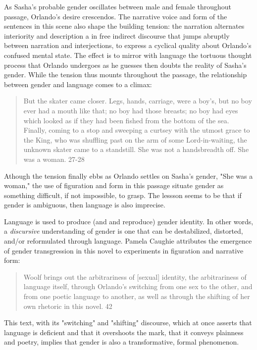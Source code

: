 \documentclass[11pt]{article}
\begin{document}
As Sasha’s probable gender oscillates between male and female
throughout passage, Orlando’s desire crescendos. The narrative voice
and form of the sentences in this scene also shape the building
tension: the narration alternates interiority and description a in
free indirect discourse that jumps abruptly between narration and
interjections, to express a cyclical quality about Orlando’s confused
mental state. The effect is to mirror with language the tortuous
thought process that Orlando undergoes as he guesses then doubts the
reality of Sasha’s gender. While the tension thus mounts throughout
the passage, the relationship between gender and language comes to a
climax:
\begin{quote}
But the skater came closer. Legs, hands, carriage, were a boy’s, but
no boy ever had a mouth like that; no boy had those breasts; no boy
had eyes which looked as if they had been fished from the bottom of
the sea. Finally, coming to a stop and sweeping a curtsey with the
utmost grace to the King, who was shuffling past on the arm of some
Lord-in-waiting, the unknown skater came to a standstill. She was not
a handsbreadth off. She was a woman. 27-28
\end{quote}
Athough the tension finally ebbs as Orlando settles on Sasha’s gender,
"She was a woman," the use of figuration and form in this passage
situate gender as something difficult, if not impossible, to
grasp. The lessson seems to be that if gender is ambiguous, then
language is also imprecise.

Language is used to produce (and and reproduce) gender identity. In
other words, a \emph{discursive} understanding of gender is one that can be
destabilized, distorted, and/or reformulated through language. Pamela
Caughie attributes the emergence of gender transgression in this novel
to experiments in figuration and narrative form:
\begin{quote}
Woolf brings out the arbitrariness of [sexual] identity, the
arbitrariness of language itself, through Orlando's switching from one
sex to the other, and from one poetic language to another, as well as
through the shifting of her own rhetoric in this novel. 42
\end{quote}
This text, with its "switching" and "shifting" discourse, which at
once asserts that language is deficient and that it overshoots the
mark, that it conveys plainness and poetry, implies that gender is
also a transformative, formal phenomenon.
\end{document}
